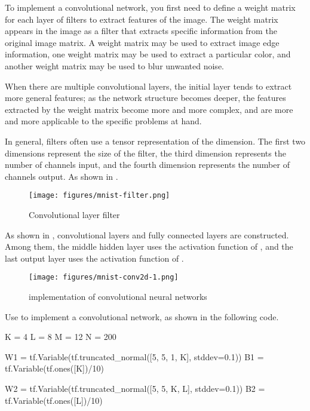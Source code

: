 \begin{content}
\begin{content}
To implement a convolutional network, you first need to define a weight matrix for each layer of filters to extract features of the image. The weight matrix appears in the image as a filter that extracts specific information from the original image matrix. A weight matrix may be used to extract image edge information, one weight matrix may be used to extract a particular color, and another weight matrix may be used to blur unwanted noise.

When there are multiple convolutional layers, the initial layer tends to extract more general features; as the network structure becomes deeper, the features extracted by the weight matrix become more and more complex, and are more and more applicable to the specific problems at hand.

In general, filters often use a tensor representation of the  dimension. The first two dimensions represent the size of the filter, the third dimension represents the number of channels input, and the fourth dimension represents the number of channels output. As shown in .

\begin{figure}[H]
\centering
\texttt{[image: figures/mnist-filter.png]}
\caption{Convolutional layer filter}
 \label{fig:mnist-filter}
\end{figure}

As shown in ,  convolutional layers and  fully connected layers are constructed. Among them, the middle hidden layer uses the activation function of , and the last output layer uses the activation function of .

\begin{figure}[H]
\centering
\texttt{[image: figures/mnist-conv2d-1.png]}
\caption{implementation of convolutional neural networks}
 \label{fig:mnist-conv2d-1}
\end{figure}

Use \tf{} to implement a convolutional network, as shown in the following code.

\begin{leftbar}
\begin{python}
K = 4 
L = 8
M = 12
N = 200

W1 = tf.Variable(tf.truncated_normal([5, 5, 1, K], stddev=0.1))
B1 = tf.Variable(tf.ones([K])/10)

W2 = tf.Variable(tf.truncated_normal([5, 5, K, L], stddev=0.1))
B2 = tf.Variable(tf.ones([L])/10)


\end{python}
\end{leftbar}
\end{content}
\end{content}
